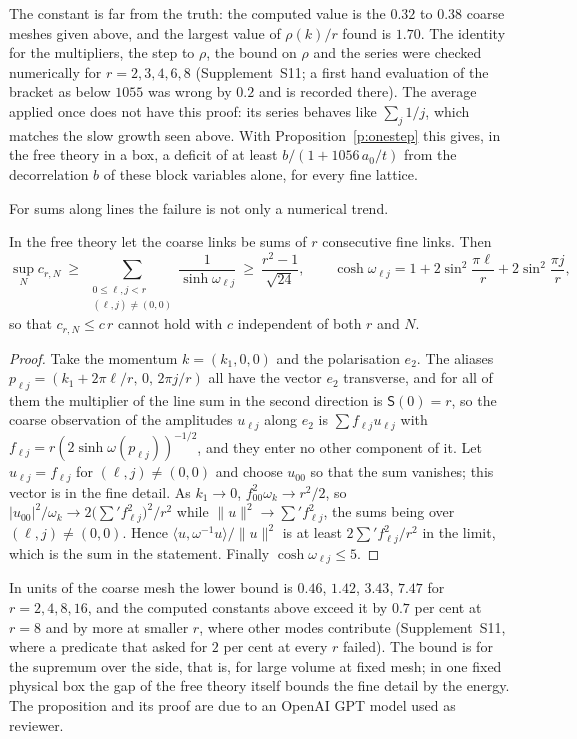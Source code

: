 The constant is far from the truth: the computed value is the $0.32$ to $0.38$ coarse meshes given above, and
the largest value of $\rho(k)/r$ found is $1.70$. The identity for the multipliers, the step to $\rho$, the bound
on $\rho$ and the series were checked numerically for $r=2,3,4,6,8$ (Supplement~S11; a first hand evaluation of
the bracket as below $1055$ was wrong by $0.2$ and is recorded there). The average applied once does not have
this proof: its series behaves like $\sum_j1/j$, which matches the slow growth seen above. With
Proposition~\ref{p:onestep} this gives, in the free theory in a box, a deficit of at least
$b/(1+1056\,a_0/t)$ from the decorrelation $b$ of these block variables alone, for every fine lattice.

For sums along lines the failure is not only a numerical trend.

\begin{proposition}\label{p:linesum}
In the free theory let the coarse links be sums of $r$ consecutive fine links. Then
\[
\sup_Nc_{r,N}\ \ge\ \sum_{\substack{0\le\ell,j<r\\(\ell,j)\ne(0,0)}}\frac1{\sinh\omega_{\ell j}}\ \ge\ \frac{r^2-1}{\sqrt{24}},
\qquad\cosh\omega_{\ell j}=1+2\sin^2\frac{\pi\ell}r+2\sin^2\frac{\pi j}r ,
\]
so that $c_{r,N}\le c\,r$ cannot hold with $c$ independent of both $r$ and $N$.
\end{proposition}
\begin{proof}
Take the momentum $k=(k_1,0,0)$ and the polarisation $e_2$. The aliases
$p_{\ell j}=(k_1+2\pi\ell/r,\,0,\,2\pi j/r)$ all have the vector $e_2$ transverse, and for all of them the
multiplier of the line sum in the second direction is $\mathsf S(0)=r$, so the coarse observation of the
amplitudes $u_{\ell j}$ along $e_2$ is $\sum f_{\ell j}u_{\ell j}$ with $f_{\ell j}=r(2\sinh\omega(p_{\ell j}))^{-1/2}$,
and they enter no other component of it. Let $u_{\ell j}=f_{\ell j}$ for $(\ell,j)\ne(0,0)$ and choose
$u_{00}$ so that the sum vanishes; this vector is in the fine detail. As $k_1\to0$,
$f_{00}^2\omega_k\to r^2/2$, so $|u_{00}|^2/\omega_k\to2\big(\sum'f_{\ell j}^2\big)^2/r^2$ while
$\|u\|^2\to\sum'f_{\ell j}^2$, the sums being over $(\ell,j)\ne(0,0)$. Hence
$\langle u,\omega^{-1}u\rangle/\|u\|^2$ is at least $2\sum'f_{\ell j}^2/r^2$ in the limit, which is the sum in
the statement. Finally $\cosh\omega_{\ell j}\le5$.
\end{proof}

In units of the coarse mesh the lower bound is $0.46$, $1.42$, $3.43$, $7.47$ for $r=2,4,8,16$, and the
computed constants above exceed it by $0.7$ per cent at $r=8$ and by more at smaller $r$, where other modes
contribute (Supplement~S11, where a predicate that asked for $2$ per cent at every $r$ failed). The bound is
for the supremum over the side, that is, for large volume at fixed mesh; in one fixed physical box the gap of
the free theory itself bounds the fine detail by the energy. The proposition and its proof are due to an
OpenAI GPT model used as reviewer.

